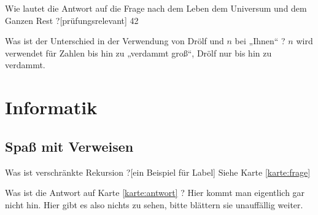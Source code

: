 \documentclass[a6paper]{kartei}
\begin{document}
\begin{karte}[Lebensphilosophie]{Wie lautet die Antwort auf die Frage nach dem Leben dem Universum und dem Ganzen Rest ?}[prüfungsrelevant]
	42
	\end{karte}
	
 	\begin{karte}[Zahlenkunde]{Was ist der Unterschied in der Verwendung von Drölf und $n$ bei „Ihnen“ ?}
	$n$ wird verwendet für Zahlen bis hin zu „verdammt groß“, Drölf nur bis hin zu verdammt.
	\end{karte}
	\section*{Informatik}
	\subsection*{Spaß mit Verweisen}
	\renewcommand{\kommentarstil}{\textsc}
	\begin{karte}{Was ist verschränkte Rekursion ?}[ein Beispiel für Label]
	\label{karte:antwort} Siehe Karte \ref{karte:frage}
	\end{karte}

	\begin{karte}{Was ist die Antwort auf Karte \ref{karte:antwort} ?}
	\label{karte:frage}		Hier kommt man eigentlich gar nicht hin. Hier gibt es also nichts zu sehen, bitte blättern sie unauffällig weiter.
	\end{karte}
\end{document}
